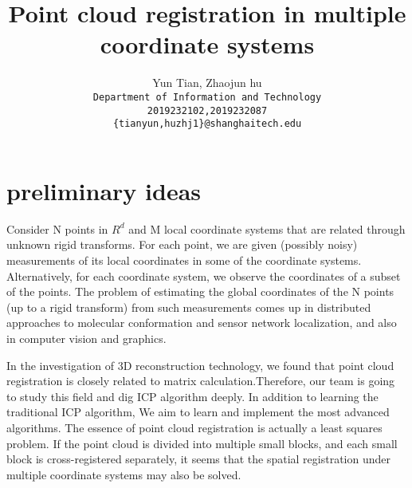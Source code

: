 \documentclass{article} %
\title{Point cloud registration in multiple coordinate systems}
\author{Yun Tian, Zhaojun hu \\
	\texttt{Department of Information and Technology}\\
	\texttt{2019232102,2019232087}\\
	\texttt{\{tianyun,huzhj1\}@shanghaitech.edu}}
\begin{document}
	\maketitle
	

\section{preliminary ideas}

Consider N points in $R^d$ and M local coordinate systems that are related through unknown rigid transforms. For each point, we are given (possibly noisy) measurements of its local coordinates in some of the coordinate systems. Alternatively, for each coordinate system, we observe the coordinates of a subset of the points. The problem of estimating the global coordinates of the N points (up to a rigid transform) from such measurements comes up in distributed approaches to molecular conformation and sensor network localization, and also in computer vision and graphics.

In the investigation of 3D reconstruction technology, we found that point cloud registration is closely related to matrix calculation.Therefore, our team is going to study this field and dig ICP algorithm deeply. In addition to learning the traditional ICP algorithm, We aim to learn and implement the most advanced algorithms. The essence of point cloud registration is actually a least squares problem. If the point cloud is divided into multiple small blocks, and each small block is cross-registered separately, it seems that the spatial registration under multiple coordinate systems may also be solved.
\end{document}
